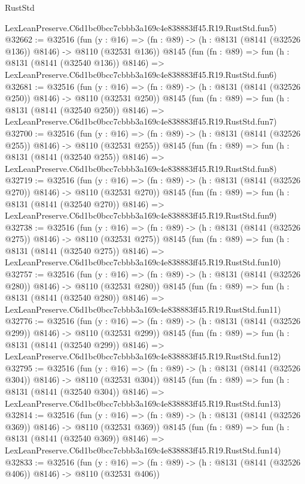 \begin{lexlean}{RustStd}
\begin{coremodule}
    LexLeanPreserve.C6d1bc0bcc7cbbb3a169c4e838883ff45.R19.RustStd.fun5)
@32662 := @32516
    (fun (y : @16) => (fn : @89) -> (h : @8131 (@8141 (@32526 @136)) @8146) -> @8110 (@32531 @136))
    @8145
    (fun (fn : @89) =>
    fun (h : @8131 (@8141 (@32540 @136)) @8146) =>
    LexLeanPreserve.C6d1bc0bcc7cbbb3a169c4e838883ff45.R19.RustStd.fun6)
@32681 := @32516
    (fun (y : @16) => (fn : @89) -> (h : @8131 (@8141 (@32526 @250)) @8146) -> @8110 (@32531 @250))
    @8145
    (fun (fn : @89) =>
    fun (h : @8131 (@8141 (@32540 @250)) @8146) =>
    LexLeanPreserve.C6d1bc0bcc7cbbb3a169c4e838883ff45.R19.RustStd.fun7)
@32700 := @32516
    (fun (y : @16) => (fn : @89) -> (h : @8131 (@8141 (@32526 @255)) @8146) -> @8110 (@32531 @255))
    @8145
    (fun (fn : @89) =>
    fun (h : @8131 (@8141 (@32540 @255)) @8146) =>
    LexLeanPreserve.C6d1bc0bcc7cbbb3a169c4e838883ff45.R19.RustStd.fun8)
@32719 := @32516
    (fun (y : @16) => (fn : @89) -> (h : @8131 (@8141 (@32526 @270)) @8146) -> @8110 (@32531 @270))
    @8145
    (fun (fn : @89) =>
    fun (h : @8131 (@8141 (@32540 @270)) @8146) =>
    LexLeanPreserve.C6d1bc0bcc7cbbb3a169c4e838883ff45.R19.RustStd.fun9)
@32738 := @32516
    (fun (y : @16) => (fn : @89) -> (h : @8131 (@8141 (@32526 @275)) @8146) -> @8110 (@32531 @275))
    @8145
    (fun (fn : @89) =>
    fun (h : @8131 (@8141 (@32540 @275)) @8146) =>
    LexLeanPreserve.C6d1bc0bcc7cbbb3a169c4e838883ff45.R19.RustStd.fun10)
@32757 := @32516
    (fun (y : @16) => (fn : @89) -> (h : @8131 (@8141 (@32526 @280)) @8146) -> @8110 (@32531 @280))
    @8145
    (fun (fn : @89) =>
    fun (h : @8131 (@8141 (@32540 @280)) @8146) =>
    LexLeanPreserve.C6d1bc0bcc7cbbb3a169c4e838883ff45.R19.RustStd.fun11)
@32776 := @32516
    (fun (y : @16) => (fn : @89) -> (h : @8131 (@8141 (@32526 @299)) @8146) -> @8110 (@32531 @299))
    @8145
    (fun (fn : @89) =>
    fun (h : @8131 (@8141 (@32540 @299)) @8146) =>
    LexLeanPreserve.C6d1bc0bcc7cbbb3a169c4e838883ff45.R19.RustStd.fun12)
@32795 := @32516
    (fun (y : @16) => (fn : @89) -> (h : @8131 (@8141 (@32526 @304)) @8146) -> @8110 (@32531 @304))
    @8145
    (fun (fn : @89) =>
    fun (h : @8131 (@8141 (@32540 @304)) @8146) =>
    LexLeanPreserve.C6d1bc0bcc7cbbb3a169c4e838883ff45.R19.RustStd.fun13)
@32814 := @32516
    (fun (y : @16) => (fn : @89) -> (h : @8131 (@8141 (@32526 @369)) @8146) -> @8110 (@32531 @369))
    @8145
    (fun (fn : @89) =>
    fun (h : @8131 (@8141 (@32540 @369)) @8146) =>
    LexLeanPreserve.C6d1bc0bcc7cbbb3a169c4e838883ff45.R19.RustStd.fun14)
@32833 := @32516
    (fun (y : @16) => (fn : @89) -> (h : @8131 (@8141 (@32526 @406)) @8146) -> @8110 (@32531 @406))

\end{coremodule}
\end{lexlean}
